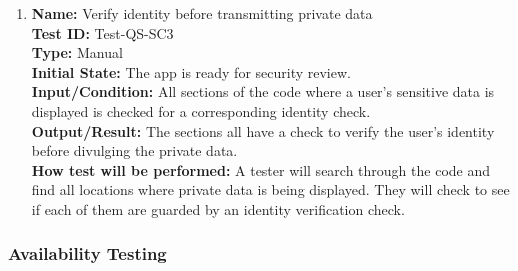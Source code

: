 \documentclass[12pt, titlepage]{article}
\begin{document}
\begin{enumerate}
  \item
        \textbf{Name:} Verify identity before transmitting private data \label{itm:Test-QS-SC3} \\
        \textbf{Test ID:} Test-QS-SC3 \\
        \textbf{Type:} Manual \\
        \textbf{Initial State:} The app is ready for security review. \\
        \textbf{Input/Condition:} All sections of the code where a user's sensitive data is displayed is checked for a corresponding identity check. \\
        \textbf{Output/Result:} The sections all have a check to verify the user's identity before divulging the private data. \\
        \textbf{How test will be performed:} A tester will search through the code and find all locations where private data is being displayed. They will check to see if each of them are guarded by an identity verification check.

\end{enumerate}
\subsubsection{Availability Testing}
\end{document}
